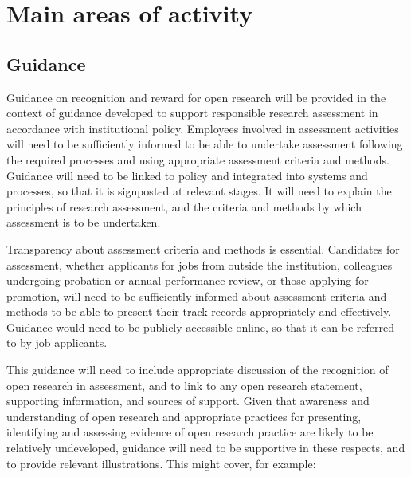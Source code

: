 \documentclass[
  letterpaper,
  DIV=11,
  numbers=noendperiod,
  oneside]{scrreprt}
\begin{document}
\section{Main areas of activity}\label{main-areas-of-activity-6}

\subsection{Guidance}\label{guidance}

Guidance on recognition and reward for open research will be provided in
the context of guidance developed to support responsible research
assessment in accordance with institutional policy. Employees involved
in assessment activities will need to be sufficiently informed to be
able to undertake assessment following the required processes and using
appropriate assessment criteria and methods. Guidance will need to be
linked to policy and integrated into systems and processes, so that it
is signposted at relevant stages. It will need to explain the principles
of research assessment, and the criteria and methods by which assessment
is to be undertaken.

Transparency about assessment criteria and methods is essential.
Candidates for assessment, whether applicants for jobs from outside the
institution, colleagues undergoing probation or annual performance
review, or those applying for promotion, will need to be sufficiently
informed about assessment criteria and methods to be able to present
their track records appropriately and effectively. Guidance would need
to be publicly accessible online, so that it can be referred to by job
applicants.

This guidance will need to include appropriate discussion of the
recognition of open research in assessment, and to link to any open
research statement, supporting information, and sources of support.
Given that awareness and understanding of open research and appropriate
practices for presenting, identifying and assessing evidence of open
research practice are likely to be relatively undeveloped, guidance will
need to be supportive in these respects, and to provide relevant
illustrations. This might cover, for example:
\end{document}
